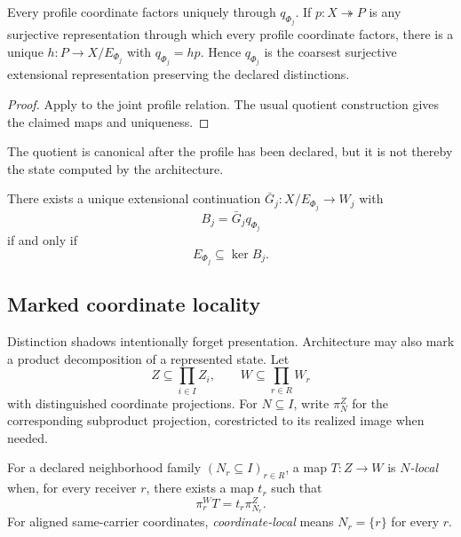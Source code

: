 \begin{corollary}\label{cor:canonical-distinction-quotient-v13}
Every profile coordinate factors uniquely through $q_{\Phi_j}$. If $p:X\twoheadrightarrow P$ is any surjective representation through which every profile coordinate factors, there is a unique $h:P\to X/E_{\Phi_j}$ with $q_{\Phi_j}=hp$. Hence $q_{\Phi_j}$ is the coarsest surjective extensional representation preserving the declared distinctions.
\end{corollary}

\begin{proof}
Apply  to the joint profile relation. The usual quotient construction gives the claimed maps and uniqueness.
\end{proof}

The quotient is canonical after the profile has been declared, but it is not thereby the state computed by the architecture.

\begin{corollary}\label{cor:branch-realization-v13}
There exists a unique extensional continuation $\bar G_j:X/E_{\Phi_j}\to W_j$ with
\[
B_j=\bar G_jq_{\Phi_j}
\]
if and only if
\[
E_{\Phi_j}\subseteq\ker B_j.
\]
\end{corollary}

\subsection{Marked coordinate locality}

Distinction shadows intentionally forget presentation. Architecture may also mark a product decomposition of a represented state. Let
\[
Z\subseteq\prod_{i\in I}Z_i,
\qquad
W\subseteq\prod_{r\in R}W_r
\]
with distinguished coordinate projections. For $N\subseteq I$, write $\pi_N^Z$ for the corresponding subproduct projection, corestricted to its realized image when needed.

\begin{definition}\label{def:marked-locality-v13}
For a declared neighborhood family $(N_r\subseteq I)_{r\in R}$, a map $T:Z\to W$ is \emph{$N$-local} when, for every receiver $r$, there exists a map $t_r$ such that
\[
\boxed{\pi_r^WT=t_r\pi_{N_r}^Z.}
\]
For aligned same-carrier coordinates, \emph{coordinate-local} means $N_r=\{r\}$ for every $r$.
\end{definition}


